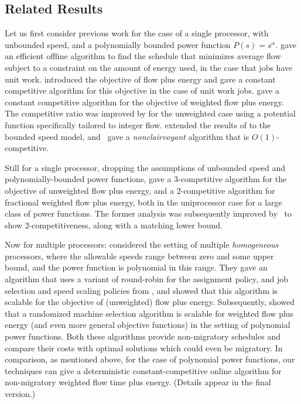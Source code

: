\documentclass[11pt]{article}
\begin{document}
\subsection{Related Results}
\label{sec:related-results}

Let us first consider previous work for the case of a single processor,
with unbounded speed, and a polynomially bounded power function $P(s) =
s^\alpha$.  \cite{PUW} gave an efficient offline algorithm to find the
schedule that minimizes average flow subject to a constraint on the
amount of energy used, in the case that jobs have unit work. \cite{AF}
introduced the objective of flow plus energy and gave a constant
competitive algorithm for this objective in the case of unit
work jobs. \cite{BPS} gave a constant competitive algorithm for the
objective of weighted flow plus energy.  The competitive ratio was
improved by \cite{LLTW08} for the unweighted case using a potential
function specifically tailored to integer flow. \cite{BCLL08} extended
the results of \cite{BPS} to the bounded speed model,
and~\cite{STACS2009} gave a \emph{nonclairvoyant} algorithm that is
$O(1)$-competitive.

Still for a single processor, dropping the assumptions of unbounded
speed and polynomially-bounded power functions, \cite{BCP} gave a
$3$-competitive algorithm for the objective of unweighted flow plus
energy, and a $2$-competitive algorithm for fractional weighted flow
plus energy, both in the uniprocessor case for a large class of power
functions.  The former analysis was subsequently improved
by~\cite{Lachlan2009} to show $2$-competitiveness, along with a matching
lower bound.

Now for multiple processors:
\cite{Lam08} considered the setting of multiple \emph{homogeneous}
processors, where the allowable speeds range between zero and some upper
bound, and the power function is polynomial in this range.  They gave an
algorithm that uses a variant of round-robin for the assignment
policy, and job selection and speed scaling policies from
\cite{BPS}, and showed that this algorithm is scalable for the objective 
of (unweighted) flow plus energy.
Subsequently, \cite{GNS09} showed that a randomized machine selection
algorithm is scalable for weighted flow plus energy (and even more
general objective functions) in the setting of polynomial power 
functions. Both these algorithms provide non-migratory schedules and 
compare their costs with optimal solutions which could even be migratory. 
In comparison, as mentioned above, for the case of polynomial power 
functions, our techniques can give a deterministic constant-competitive 
online algorithm for non-migratory weighted flow time plus energy.
(Details appear in the final version.)
\end{document}
